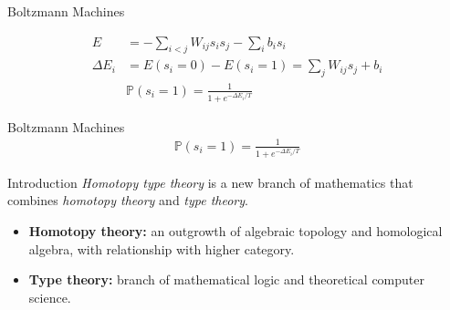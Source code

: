 \documentclass[10pt]{beamer}
\begin{document}
\begin{frame}{Boltzmann Machines}
\begin{figure}[h]
\centering
{}
\end{figure}
\begin{align*}
E &= -\sum_{i<j}W_{ij}s_is_j - \sum_ib_i s_i \\
\Delta E_i &= E(s_i = 0) - E(s_i = 1) = \sum_jW_{ij}s_j +b_i\\
&\mathbb{P}(s_i=1) = \frac{1}{1+e^{-\Delta E_i/T}}
\end{align*}
\end{frame}




\begin{frame}{Boltzmann Machines}
\begin{align*}
\mathbb{P}(s_i=1) = \frac{1}{1+e^{-\Delta E_i/T}}
\end{align*}
\end{frame}





\begin{frame}{Introduction}
\emph{Homotopy type theory} is a new branch of mathematics that combines \emph{homotopy theory} and \emph{type theory}. 
\begin{itemize}
\item \textbf{Homotopy theory:} an outgrowth of algebraic topology and homological algebra, with relationship with higher category.
\item \textbf{Type theory:} branch of mathematical logic and theoretical computer science.
\end{itemize}
\end{frame}
\end{document}
